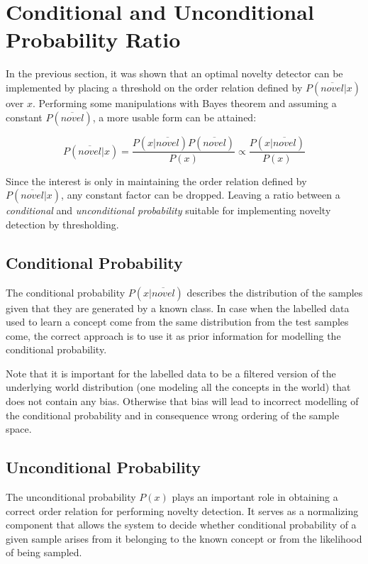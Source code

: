 \section{Conditional and Unconditional Probability Ratio}

In the previous section, it was shown that an optimal novelty detector can be
implemented by placing a threshold on the order relation defined by
$P(\overline{novel}|x)$ over $x$. Performing some manipulations with
Bayes theorem and assuming a constant $P(\overline{novel})$, a more usable
form can be attained:

\begin{equation}
\label{eq:novelty-ratio}
          P(\overline{novel}|x)
  =       \frac{P(x|\overline{novel}) P(\overline{novel})}{P(x)}
  \propto \frac{P(x|\overline{novel})}{P(x)}
\end{equation}

Since the interest is only in maintaining the order relation defined by
$P(\overline{novel}|x)$, any constant factor can be dropped.
Leaving a ratio between a \emph{conditional} and
\emph{unconditional probability} suitable for implementing novelty detection
by thresholding.


\subsection{Conditional Probability}
The conditional probability $P(x|\overline{novel})$ describes the distribution
of the samples given that they are generated by a known class.
In case when the labelled data used to learn a concept come from
the same distribution from the test samples come, the correct approach is to use it
as prior information for modelling the conditional probability.

Note that it is important for the labelled data to be a filtered version
of the underlying world distribution (one modeling all the concepts in the world) 
that does not contain any bias. Otherwise that bias will lead to incorrect modelling of 
the conditional probability and in consequence wrong ordering of the sample space.

\subsection{Unconditional Probability}
The unconditional probability $P(x)$ plays an important role in obtaining a
correct order relation for performing novelty detection.
It serves as a normalizing component that allows the system to decide
whether conditional probability of a given sample arises from it belonging to
the known concept or from the likelihood of being sampled.

